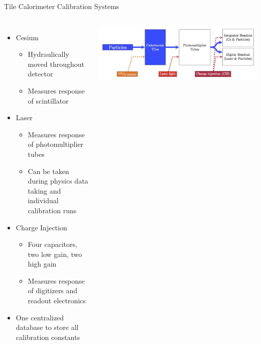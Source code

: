 \documentclass[aspectratio=169,xcolor=table]{beamer}
\begin{document}
    \begin{frame}[t]{Tile Calorimeter Calibration Systems}
      \begin{columns}
        \begin{itemize}
          \item Cesium
          \begin{itemize}
            \item Hydraulically moved throughout detector
            \item Measures response of scintillator
          \end{itemize}
          \item Laser
          \begin{itemize}
            \item Measures response of photomultiplier tubes
            \item Can be taken during physics data taking and individual calibration runs
          \end{itemize}
          \item Charge Injection
          \begin{itemize}
            \item Four capacitors, two low gain, two high gain
            \item Measures response of digitizers and readout electronics
          \end{itemize}
          \item One centralized database to store all calibration constants
        \end{itemize}
      \centering
      \includegraphics[width=\textwidth,keepaspectratio=true]{Tile_Calibration_Diagram.png}
      \end{columns}
    \end{frame}
\end{document}
